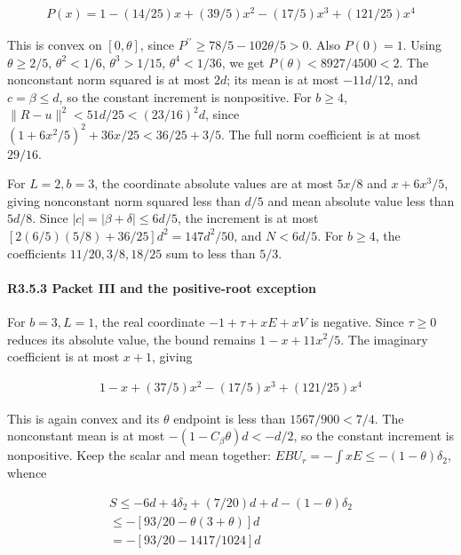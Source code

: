 \[
\begin{gathered}
P(x)=1-(14/25)x+(39/5)x^2-(17/5)x^3+(121/25)x^4
\end{gathered}
\]

This is convex on \([0,\allowbreak \allowbreak  \theta]\), since \(P^{\prime\prime}\ge78/5-102\theta/5>0\). Also \(P(0)=1\). Using \(\theta\ge2/5\), \(\theta^2<1/6\), \(\theta^3>1/15\), \(\theta^4<1/36\), we get \(P(\theta)<8927/4500<2\). The nonconstant norm squared is at most \(2d\); its mean is at most \(-11d/12\), and \(c=\beta\le d\), so the constant increment is nonpositive. For \(b\ge4\), \(\|R-u\|^2<51d/25<(23/16)^2d\), since \((1+6x^2/5)^2+36x/25<36/25+3/5\). The full norm coefficient is at most \(29/16\).

For \(L=2,\allowbreak \allowbreak  b=3\), the coordinate absolute values are at most \(5x/8\) and \(x+6x^3/5\), giving nonconstant norm squared less than \(d/5\) and mean absolute value less than \(5d/8\). Since \(|c|=|\beta+\delta|\le6d/5\), the increment is at most \([2(6/5)(5/8)+36/25]d^2=147d^2/50\), and \(N<6d/5\). For \(b\ge4\), the coefficients \(11/20,\allowbreak \allowbreak  3/8,\allowbreak \allowbreak  18/25\) sum to less than \(5/3\).

\paragraph{R3.5.3 Packet III and the positive-root exception}

For \(b=3,\allowbreak \allowbreak  L=1\), the real coordinate \(-1+\tau+xE+xV\) is negative. Since \(\tau\ge0\) reduces its absolute value, the bound remains \(1-x+11x^2/5\). The imaginary coefficient is at most \(x+1\), giving

\[
\begin{gathered}
1-x+(37/5)x^2-(17/5)x^3+(121/25)x^4
\end{gathered}
\]

This is again convex and its \(\theta\) endpoint is less than \(1567/900<7/4\). The nonconstant mean is at most \(-(1-C_\beta\theta)d<-d/2\), so the constant increment is nonpositive. Keep the scalar and mean together: \(EBU_r=-\int xE\le-(1-\theta) \delta_2\), whence

\[
\begin{gathered}
S\le -6d+4\delta_2+(7/20)d+d-(1-\theta)\delta_2\\
\le -[93/20-\theta(3+\theta)]d\\
=-[93/20-1417/1024]d 
\end{gathered}\tag{R3.5.1}
\]


